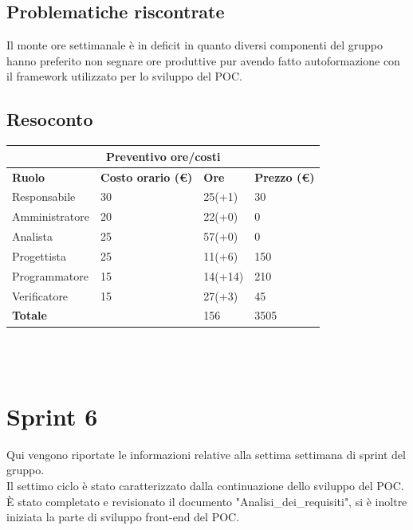 \documentclass[12pt]{article}
\begin{document}
\subsection{Problematiche riscontrate}
Il monte ore settimanale è in deficit in quanto diversi componenti del gruppo hanno preferito non segnare ore produttive pur avendo fatto autoformazione con il framework utilizzato per lo sviluppo del POC.
\subsection{Resoconto}
\begin{center}
    \begin{tabularx}{\textwidth}{|X|X|X|X|}
        \hline
        \multicolumn{4}{|c|}{\textbf{Preventivo ore/costi}}\\
        \hline
        \hline
        \textbf{Ruolo} & \textbf{Costo orario (\euro)} & \textbf{Ore} & \textbf{Prezzo (\euro)}\\
        \hline
        Responsabile    & 30 & 25(+1)  & 30\\
        \hline
        Amministratore  & 20 & 22(+0)  & 0\\
        \hline
        Analista        & 25 & 57(+0)  & 0\\
        \hline
        Progettista     & 25 & 11(+6)  & 150\\
        \hline
        Programmatore   & 15 & 14(+14)  & 210\\
        \hline
        Verificatore    & 15 & 27(+3)  & 45\\
        \hline
        \hline
        \textbf{Totale} &    & 156 &  3505 \\
        \hline
    \end{tabularx}\\[8pt]
    \mbox{}\\
\end{center}

\section{Sprint 6}
Qui vengono riportate le informazioni relative alla settima settimana di sprint del gruppo. \\
Il settimo ciclo è stato caratterizzato dalla continuazione dello sviluppo del POC. \\
È stato completato e revisionato il documento "Analisi\_dei\_requisiti", si è inoltre iniziata la parte di sviluppo front-end del POC.
\end{document}
